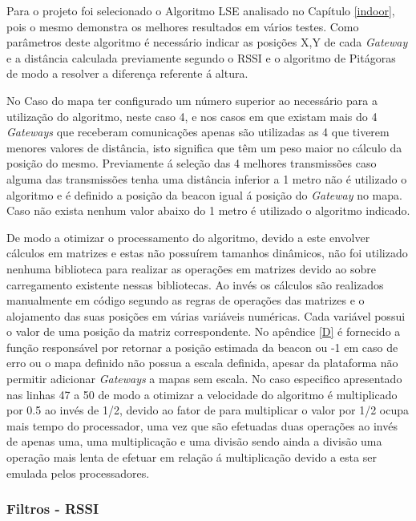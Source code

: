 \par Para o projeto foi selecionado o Algoritmo LSE analisado no Capítulo \ref{indoor}, pois o mesmo demonstra os melhores resultados em vários testes. Como parâmetros deste algoritmo é necessário indicar as posições X,Y de cada \textit{Gateway} e a distância calculada previamente segundo o RSSI e o algoritmo de Pitágoras de modo a resolver a diferença referente á altura.
\par No Caso do mapa ter configurado um número superior ao necessário para a utilização do algoritmo, neste caso 4, e nos casos em que existam mais do 4 \textit{Gateways} que receberam comunicações apenas são utilizadas as 4 que tiverem menores valores de distância, isto significa que têm um peso maior no cálculo da posição do mesmo. Previamente á seleção das 4 melhores transmissões caso alguma das transmissões tenha uma distância inferior a 1 metro não é utilizado o algoritmo e é definido a posição da beacon igual á posição do \textit{Gateway} no mapa. Caso não exista nenhum valor abaixo do 1 metro é utilizado o algoritmo indicado. 
\par De modo a otimizar o processamento do algoritmo, devido a este envolver cálculos em matrizes e estas não possuírem tamanhos dinâmicos, não foi utilizado nenhuma biblioteca para realizar as operações em matrizes devido ao sobre carregamento existente nessas bibliotecas. Ao invés os cálculos são realizados manualmente em código segundo as regras de operações das matrizes e o alojamento das suas posições em várias variáveis numéricas. Cada variável possui o valor de uma posição da matriz correspondente. No apêndice \ref{D} é fornecido a função responsável por retornar a posição estimada da beacon ou -1 em caso de erro ou o mapa definido não possua a escala definida, apesar da plataforma não permitir adicionar \textit{Gateways} a mapas sem escala. No caso especifico apresentado nas linhas 47 a 50 de modo a otimizar a velocidade do algoritmo é multiplicado por 0.5 ao invés de 1/2, devido ao fator de para multiplicar o valor por 1/2 ocupa mais tempo do processador, uma vez que são efetuadas duas operações ao invés de apenas uma, uma multiplicação e uma divisão sendo ainda a divisão uma operação mais lenta de efetuar em relação á multiplicação devido a esta ser emulada pelos processadores.

\subsubsection{Filtros - RSSI}

